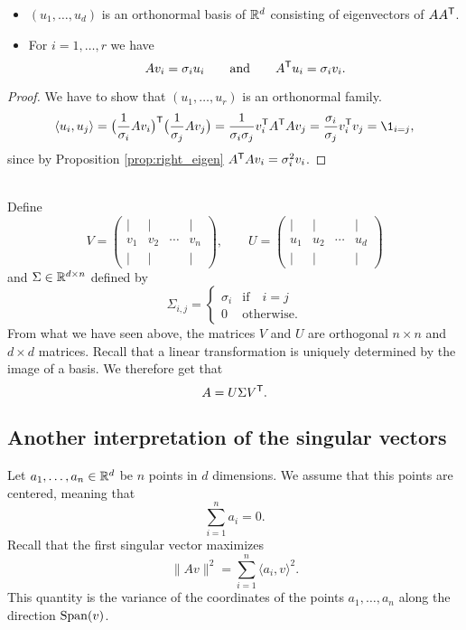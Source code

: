 \documentclass[11pt,nocut]{article}
\begin{document}
\begin{proposition}
	\begin{itemize}
		\item $(u_1, \dots, u_d)$ is an orthonormal basis of $\mathbb{R}^d$ consisting of eigenvectors of $AA^{{\sf T}}$.
		\item For $i=1, \dots, r$ we have
			$$
			A v_i = \sigma_i u_i
			\qquad \text{and} \qquad
			A^{{\sf T}} u_i = \sigma_i v_i.
			$$
	\end{itemize}
\end{proposition}
\begin{proof}
	We have to show that $(u_1, \dots, u_r)$ is an orthonormal family.
	$$
	\langle u_i, u_j \rangle = \big(\frac{1}{\sigma_i} A v_i\big)^{\sT}\big(\frac{1}{\sigma_j} A v_j\big) = \frac{1}{\sigma_i \sigma_j} v_i^{\sT} A^{\sT} A v_j
	= \frac{\sigma_i}{\sigma_j} v_i^{\sT} v_j = \1_{i = j},
	$$
	since by Proposition \ref{prop:right_eigen} $A^{{\sf T}} A v_i = \sigma_i^2 v_i$.
\end{proof}
\\

Define
$$
V = 
\begin{pmatrix}
	| & | & & | \\
	v_1 & v_2 & \cdots& v_n \\
	| & | & & |
\end{pmatrix}
,\qquad
U = 
\begin{pmatrix}
	| & | & & | \\
	u_1 & u_2 & \cdots& u_d \\
	| & | & & |
\end{pmatrix}
$$
and $\Sigma \in \mathbb{R}^{d \times n}$ defined by
$$
\Sigma_{i,j} =
\begin{cases}
	\sigma_i & \text{if} \quad i=j \\
	0 & \text{otherwise}.
\end{cases}
$$
From what we have seen above, the matrices $V$ and $U$ are orthogonal $n \times n$ and $d \times d$ matrices.
Recall that a linear transformation is uniquely determined by the image of a basis. We therefore get that
$$
A = U \Sigma V^{{\sf T}}.
$$


\subsection{Another interpretation of the singular vectors}
Let $a_1, \dots, a_n \in \mathbb{R}^d$ be $n$ points in $d$ dimensions. We assume that this points are centered, meaning that 
$$
\sum_{i=1}^n a_i = 0.
$$
Recall that the first singular vector maximizes
$$
\|A v\|^2 =  \sum_{i=1}^n \langle a_i, v \rangle^2.
$$
This quantity is the variance of the coordinates of the points $a_1, \dots, a_n$ along the direction ${{\rm Span}}(v)$.
\end{document}
